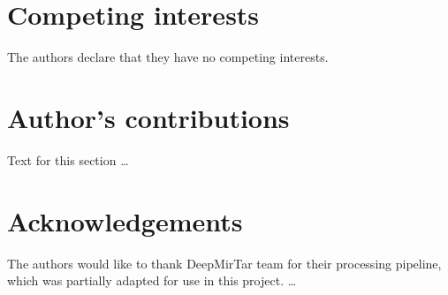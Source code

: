 \documentclass{bmcart}
\begin{document}

\begin{backmatter}

\section*{Competing interests}
  The authors declare that they have no competing interests.

\section*{Author's contributions}
    Text for this section \ldots

\section*{Acknowledgements}
  The authors would like to thank DeepMirTar team for their processing pipeline, which was partially adapted for use in this project.
 \ldots



\end{backmatter}
\end{document}
